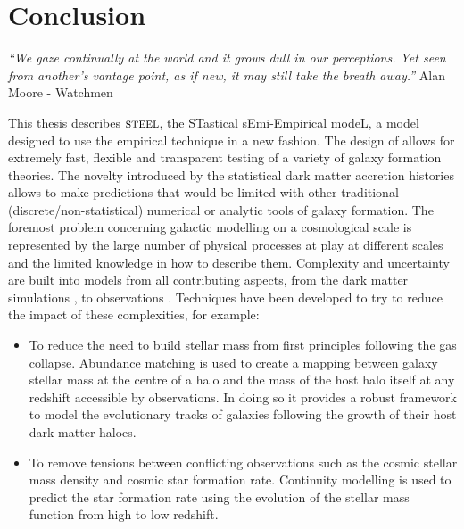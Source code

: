 
\chapter{Conclusion} %
\label{Chapter:Conclusion}
\begin{center}
    \textit{``We gaze continually at the world and it grows dull in our perceptions. Yet seen from another's vantage point, as if new, it may still take the breath away.''}
    Alan Moore - Watchmen
\end{center}


This thesis describes $\textsc{steel}$, the STastical sEmi-Empirical modeL, a model designed to use the empirical technique in a new fashion. The design of \steel allows for extremely fast, flexible and transparent testing of a variety of galaxy formation theories. The novelty introduced by the statistical dark matter accretion histories allows \steel to make predictions that would be limited with other traditional (discrete/non-statistical) numerical or analytic tools of galaxy formation. The foremost problem concerning galactic modelling on a cosmological scale is represented by the large number of physical processes at play at different scales and the limited knowledge in how to describe them. Complexity and uncertainty are built into models from all contributing aspects, from the dark matter simulations \cite[e.g.][]{vandenBosch2018DisruptionFiction}, to observations \cite[e.g.][]{Bernardi2017ComparingLight, Lapi2017StellarEquation, Leja2019AnSurvey}. Techniques have been developed to try to reduce the impact of these complexities, for example:
\begin{itemize}
    \item To reduce the need to build stellar mass from first principles following the gas collapse. Abundance matching is used to create a mapping between galaxy stellar mass at the centre of a halo and the mass of the host halo itself at any redshift accessible by observations. In doing so it provides a robust framework to model the evolutionary tracks of galaxies following the growth of their host dark matter haloes.
    \item To remove tensions between conflicting observations such as the cosmic stellar mass density and cosmic star formation rate. Continuity modelling is used to predict the star formation rate using the evolution of the stellar mass function from high to low redshift. 
\end{itemize}

